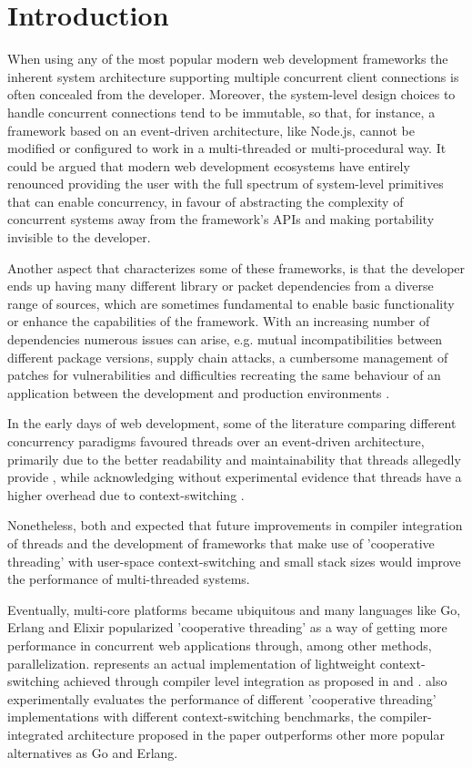 \section{Introduction}
When using any of the most popular modern web development frameworks the inherent system architecture supporting multiple concurrent client connections is often concealed from the developer. Moreover, the system-level design choices to handle concurrent connections tend to be immutable, so that, for instance, a framework based on an event-driven architecture, like Node.js, cannot be modified or configured to work in a multi-threaded or multi-procedural way. It could be argued that modern web development ecosystems have entirely renounced providing the user with the full spectrum of system-level primitives that can enable concurrency, in favour of abstracting the complexity of concurrent systems away from the framework's APIs and making portability invisible to the developer.

Another aspect that characterizes some of these frameworks, is that the developer ends up having many different library or packet dependencies from a diverse range of sources, which are sometimes fundamental to enable basic functionality or enhance the capabilities of the framework. With an increasing number of dependencies numerous issues can arise, e.g. mutual incompatibilities between different package versions, supply chain attacks, a cumbersome management of patches for vulnerabilities and difficulties recreating the same behaviour of an application between the development and production environments \cite{2012PoulHenning}. 

In the early days of web development, some of the literature comparing different concurrency paradigms favoured threads over an event-driven architecture, primarily due to the better readability and maintainability that threads allegedly provide \cite{2003Events}\cite{2005Threads}, while acknowledging without experimental evidence that threads have a higher overhead due to context-switching \cite{2003Events}. 

Nonetheless, both \cite{2003Events} and \cite{2005Threads} expected that future improvements in compiler integration of threads and the development of frameworks that make use of 'cooperative threading' with user-space context-switching and small stack sizes would improve the performance of multi-threaded systems.

Eventually, multi-core platforms became ubiquitous and many languages like Go, Erlang and Elixir popularized 'cooperative threading' as a way of getting more performance in concurrent web applications through, among other methods, parallelization. \cite{2013ContextSwitching} represents an actual implementation of lightweight context-switching achieved through compiler level integration as proposed in \cite{2003Events} and \cite{2005Threads}. \cite{2013ContextSwitching} also experimentally evaluates the performance of different 'cooperative threading' implementations with different context-switching benchmarks, the compiler-integrated architecture proposed in the paper outperforms other more popular alternatives as Go and Erlang. 

